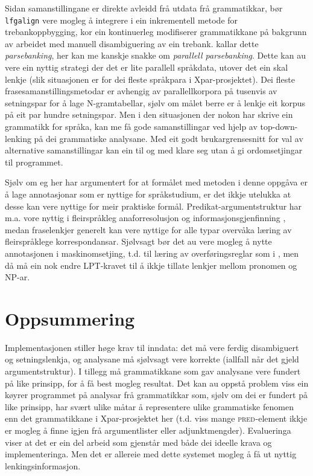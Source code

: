\documentclass[12pt,a4paper,oneside,draft]{report}
\newcommand{\F}[2]{\textsc{#1}\ensuremath{_{#2}}}
\newcommand{\PRED}{\F{pred}{}}
\begin{document}
Sidan samanstillingane er direkte avleidd frå utdata frå grammatikkar,
 bør \texttt{lfgalign} vere mogleg å integrere i ein inkrementell metode for
 trebankoppbygging, kor ein kontinuerleg modifiserer grammatikkane på
 bakgrunn av arbeidet med manuell disambiguering av ein trebank.
 \citet{rosen2007tmt} kallar dette \emph{parsebanking}, her kan me kanskje
 snakke om \emph{parallell parsebanking}. Dette kan au vere ein nyttig
 strategi der det er lite parallell språkdata, utover det ein skal
 lenkje (slik situasjonen er for dei fleste språkpara i
 Xpar-prosjektet). Dei fleste frasesamanstillingsmetodar er avhengig
 av parallellkorpora på tusenvis av setningspar for å lage
 N-gramtabellar, sjølv om målet berre er å lenkje eit korpus på eit
 par hundre setningspar. Men i den situasjonen der nokon har skrive
 ein grammatikk for språka, kan me få gode samanstillingar ved hjelp
 av top-down-lenking på dei grammatiske analysane. Med eit godt
 brukargrensesnitt for val av alternative samanstillingar kan ein til
 og med klare seg utan å gi ordomsetjingar til programmet.

Sjølv om eg her har argumentert for at formålet med metoden i denne
 oppgåva er å lage annotasjonar som er nyttige for språkstudium, er
 det ikkje utelukka at desse kan vere nyttige for meir praktiske
 formål. Predikat-argumentstruktur har m.a. vore nyttig i
 fleirspråkleg anaforresolusjon og informasjonsgjenfinning
 \citep{surdeanu2003upa,azzam1998crm}, medan fraselenkjer generelt kan
 vere nyttige for alle typar overvåka læring av fleirspråklege
 korrespondansar. Sjølvsagt bør det au vere mogleg å nytte
 annotasjonen i maskinomsetjing, t.d. til læring av overføringsreglar
 som i \citet{riezler2006gmt,graham2009fts}, men då må ein nok endre
 LPT-kravet til å ikkje tillate lenkjer mellom pronomen og NP-ar.


\section{Oppsummering}
\label{sec-5.6}

Implementasjonen stiller høge krav til inndata: det må vere ferdig
 disambiguert og setningslenkja, og analysane må sjølvsagt vere
 korrekte (iallfall når det gjeld argumentstruktur). I tillegg må
 grammatikkane som gav analysane vere fundert på like prinsipp, for å
 få best mogleg resultat. Det kan au oppstå problem viss ein køyrer
 programmet på analysar frå grammatikkar som, sjølv om dei er fundert
 på like prinsipp, har svært ulike måtar å representere ulike
 grammatiske fenomen enn det grammatikkane i Xpar-prosjektet her
 (t.d. viss mange \PRED{}-element ikkje er mogleg å finne igjen frå
 argumentlister eller adjunktmengder). Evalueringa viser at det er ein
 del arbeid som gjenstår med både dei ideelle krava og
 implementeringa. Men det er allereie med dette systemet mogleg å få
 ut nyttig lenkingsinformasjon.
\end{document}
